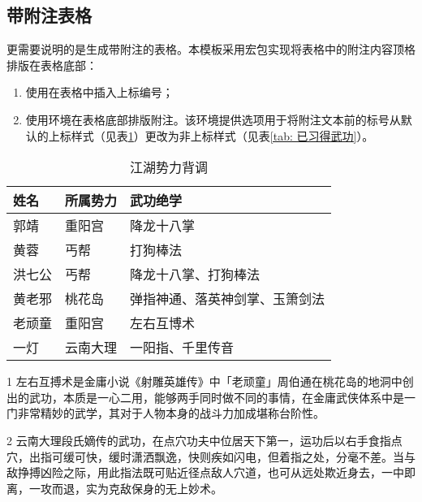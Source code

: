 \documentclass[print, doctor, vlined]{DissertUESTC}
\begin{document}
	
	\newpage
	\subsection{带附注表格}
	
	更需要说明的是生成带附注的表格。本模板采用宏包实现将表格中的附注内容顶格排版在表格底部：
	\begin{enumerate}
		\item 使用在表格中插入上标编号；
		\setcounter{enumi}{98}
		\item 使用环境在表格底部排版附注。该环境提供选项用于将附注文本前的标号从默认的上标样式（见表\ref{tab: 江湖势力背调}）更改为非上标样式（见表\ref{tab: 已习得武功}）。
	\end{enumerate}
	
	\begin{table}[!ht]
		\caption{江湖势力背调} \label{tab: 江湖势力背调}
		\begin{threeparttable}
			\begin{tabular}{p{2cm} p{3cm} p{7cm}}
				\toprule
				\textbf{姓名} & \textbf{所属势力} & \textbf{武功绝学} \\
				\midrule
				郭靖 & 重阳宫 & 降龙十八掌 \\
				黄蓉 & 丐帮 & 打狗棒法 \\
				洪七公 & 丐帮 & 降龙十八掌、打狗棒法 \\
				黄老邪 & 桃花岛 & 弹指神通、落英神剑掌、玉箫剑法 \\
				老顽童 & 重阳宫 & 左右互博术\tnote{1} \\
				一灯 & 云南大理 & 一阳指\tnote{2}、千里传音 \\
				\bottomrule
			\end{tabular}
			\begin{tablenotes}
				\item[1] 左右互搏术是金庸小说《射雕英雄传》中「老顽童」周伯通在桃花岛的地洞中创出的武功，本质是一心二用，能够两手同时做不同的事情，在金庸武侠体系中是一门非常精妙的武学，其对于人物本身的战斗力加成堪称台阶性。
				\item[2] 云南大理段氏嫡传的武功，在点穴功夫中位居天下第一，运功后以右手食指点穴，出指可缓可快，缓时潇洒飘逸，快则疾如闪电，但着指之处，分毫不差。当与敌挣搏凶险之际，用此指法既可贴近径点敌人穴道，也可从远处欺近身去，一中即离，一攻而退，实为克敌保身的无上妙术。
			\end{tablenotes}
		\end{threeparttable}
	\end{table}
	
\end{document}
